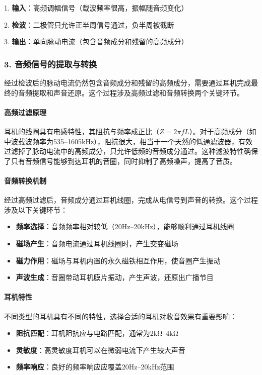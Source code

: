 \documentclass[12pt,UTF8]{ctexbook}
\begin{document}
1. \textbf{输入}：高频调幅信号（载波频率很高，振幅随音频变化）

2. \textbf{检波}：二极管只允许正半周信号通过，负半周被截断

3. \textbf{输出}：单向脉动电流（包含音频成分和残留的高频成分）

\subsubsection{3. 音频信号的提取与转换}

经过检波后的脉动电流仍然包含音频成分和残留的高频成分，需要通过耳机完成最终的音频提取和声音还原。这个过程涉及高频过滤和音频转换两个关键环节。

\paragraph{高频过滤原理}

耳机的线圈具有电感特性，其阻抗与频率成正比（$Z = 2\pi fL$）。对于高频成分（如中波载波频率为535--1605kHz），阻抗很大，相当于一个天然的低通滤波器，有效过滤掉了脉动电流中的高频成分，只允许低频的音频成分通过。这种滤波特性确保了只有音频信号能够到达耳机的音圈，同时抑制了高频噪声，提高了音质。

\paragraph{音频转换机制}

经过高频过滤后，音频成分通过耳机线圈，完成从电信号到声音的转换。这个过程涉及以下关键环节：
\begin{itemize}[leftmargin=3.5em]
  \item \textbf{频率选择}：音频频率相对较低（20Hz--20kHz），能够顺利通过耳机线圈
  \item \textbf{磁场产生}：音频电流通过耳机线圈时，产生交变磁场
  \item \textbf{磁力作用}：磁场与耳机内置的永久磁铁相互作用，使音圈产生振动
  \item \textbf{声波生成}：音圈带动耳机膜片振动，产生声波，还原出广播节目
\end{itemize}

\paragraph{耳机特性}
不同类型的耳机具有不同的特性，选择合适的耳机对收音效果有重要影响：
\begin{itemize}[leftmargin=3.5em]
  \item \textbf{阻抗匹配}：耳机阻抗应与电路匹配，通常为2kΩ--4kΩ
  \item \textbf{灵敏度}：高灵敏度耳机可以在微弱电流下产生较大声音
  \item \textbf{频率响应}：良好的频率响应应覆盖20Hz--20kHz范围
\end{itemize}
\end{document}
